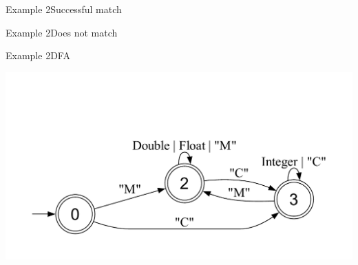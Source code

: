 \newsavebox\exampleAbbox
\begin{lrbox}{\exampleAbbox}
  \begin{minipage}{12cm}
    
  \end{minipage}
\end{lrbox}



\begin{frame}{Example 2}{Successful match}
  \usebox\exampleAbbox
\end{frame}

\newsavebox\exampleAcbox
\begin{lrbox}{\exampleAcbox}
  \begin{minipage}{12cm}
    
  \end{minipage}
\end{lrbox}



\begin{frame}{Example 2}{Does not match}
  \usebox\exampleAcbox
\end{frame}

\newsavebox\exampleAdbox
\begin{lrbox}{\exampleAdbox}
  \begin{minipage}{12cm}
    
  \end{minipage}
\end{lrbox}


\begin{frame}{Example 2}{DFA}
  \usebox\exampleAdbox
  
  \includegraphics[height=0.5\textheight,trim = {1.8cm 1.0cm 0 3.5cm}, clip]{example2.pdf}
\end{frame}
